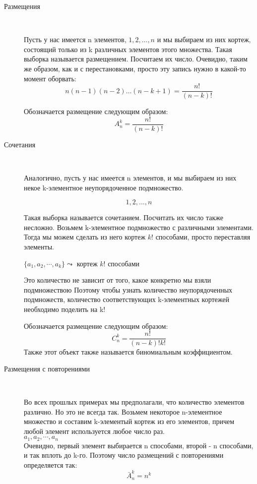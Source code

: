 \begin{description}
\item[Размещения]~	

Пусть у нас имеется n элементов, 
${1,2, \ldots , n}$
и мы выбираем из них кортеж, состоящий только из k различных элементов этого множества.
Такая выборка называется размещением. Посчитаем их число. Очевидно, таким же образом, как и с перестановками, просто эту запись нужно в какой-то момент оборвать:
$$
n(n-1)(n-2) \ldots (n - k + 1) = \frac{n!}{(n-k)!}
$$

Обозначается размещение следующим образом:
$$
A_n^k = \frac{n!}{(n-k)!}
$$
\end{description}

\begin{description}
\item[Сочетания]~	

Аналогично, пусть у нас имеется n элементов, и мы выбираем из них некое k-элементное неупорядоченное подмножество.

$${1,2, \ldots , n}$$

Такая выборка называется сочетанием. Посчитать их число также несложно. 
Возьмем k-элементное подмножество с различными элементами.
Тогда мы можем сделать из него кортеж $k!$ способами, просто переставляя элементы.


$\{a_1, a_2, \cdots ,a_k\} \leadsto$  кортеж $k!$ способами 

Это количество не зависит от того, какое конкретно мы взяли подмножествою
Поэтому чтобы узнать количество неупорядоченных подмножеств, 
количество соответствующих k-элементных кортежей необходимо поделить на k!


Обозначается размещение следующим образом:
$$
C_n^k = \frac{n!}{(n-k)!k!}
$$
Также этот объект также называется биномиальным коэффициентом.

\end{description}

\begin{description}
\item[Размещения с повторениями]~	

Во всех прошлых примерах мы предполагали, что количество элементов различно.
Но это не всегда так.
Возьмем некоторое n-элементное множество и составим k-элементый кортеж из его элементов, причем любой элемент используется любое число раз.\\
${a_1, a_2, \cdots ,a_n}$\\
Очевидно, первый элемент выбирается n способами, второй - n способами, и так вплоть до k-го.
Поэтому число размещений с повторениями определяется так:
$$
\bar{A}_n^k = n^k
$$

\end{description}


